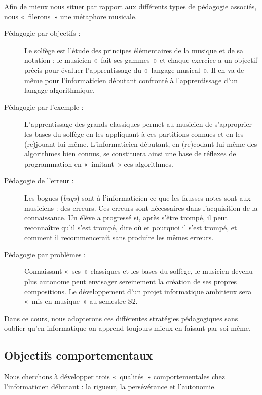 \documentclass[11pt,a4paper,colorlinks,breaklinks]{article}
\begin{document}
Afin de mieux nous situer par rapport aux différents types de pédagogie
associés, nous «~filerons~» une métaphore musicale.
\begin{description}
\item[Pédagogie par objectifs :] Le solfège est l'étude des principes élémentaires
	de la musique et de sa notation : le musicien «~fait ses gammes~» et chaque exercice
	a un objectif précis pour évaluer l'apprentissage du «~langage musical~».
	Il en va de même pour l'informaticien débutant confronté à l'apprentissage d'un 
	langage algorithmique.
\item[Pédagogie par l'exemple :] L'apprentissage des grands classiques 
	permet au musicien
	de s'ap\-proprier les bases du solfège en les appliquant à ces partitions connues et en les
	(re)jouant lui-même. L'informaticien débutant, en (re)codant lui-même des algorithmes bien
	connus, se constituera ainsi une base de réflexes de programmation en «~imitant~» ces
	algorithmes.
\item[Pédagogie de l'erreur :] Les bogues ({\em bugs}) sont à l'informaticien ce que les fausses notes
	sont aux musiciens : des erreurs. 
	Ces erreurs sont nécessaires dans l'acquisition de la connaissance.
	Un élève a progressé si, après s'être trompé,
	il peut reconnaître qu'il s'est trompé,  dire où et pourquoi il s'est trompé,
	et comment il recommencerait sans produire les mêmes erreurs.
\item[Pédagogie par problèmes :] Connaissant «~ses~» classiques et les bases du solfège, le musicien
	devenu plus autonome peut envisager sereinement la création de ses propres compositions.
	Le développement d'un projet informatique ambitieux sera «~mis en musique~» au semestre S2.
\end{description}

Dans ce cours, nous adopterons ces différentes stratégies pédagogiques sans oublier
qu'en informatique on apprend toujours mieux en faisant par soi-même.

\subsection{Objectifs comportementaux}
Nous cherchons à développer trois «~qualités~» comportementales chez l'informaticien
débu\-tant : la rigueur, la persévérance et l'autonomie.
\end{document}
